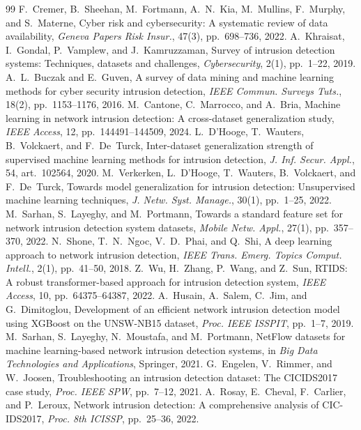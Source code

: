 \documentclass[11pt,a4paper]{article}
\begin{document}
\begin{thebibliography}{99}
 F.~Cremer, B.~Sheehan, M.~Fortmann, A.~N.~Kia, M.~Mullins, F.~Murphy, and S.~Materne, Cyber risk and cybersecurity: A systematic review of data availability, \emph{Geneva Papers Risk Insur.}, 47(3), pp.~698--736, 2022.
 A.~Khraisat, I.~Gondal, P.~Vamplew, and J.~Kamruzzaman, Survey of intrusion detection systems: Techniques, datasets and challenges, \emph{Cybersecurity}, 2(1), pp.~1--22, 2019.
 A.~L.~Buczak and E.~Guven, A survey of data mining and machine learning methods for cyber security intrusion detection, \emph{IEEE Commun. Surveys Tuts.}, 18(2), pp.~1153--1176, 2016.
 M.~Cantone, C.~Marrocco, and A.~Bria, Machine learning in network intrusion detection: A cross-dataset generalization study, \emph{IEEE Access}, 12, pp.~144491--144509, 2024.
 L.~D'Hooge, T.~Wauters, B.~Volckaert, and F.~De~Turck, Inter-dataset generalization strength of supervised machine learning methods for intrusion detection, \emph{J. Inf. Secur. Appl.}, 54, art.~102564, 2020.
 M.~Verkerken, L.~D'Hooge, T.~Wauters, B.~Volckaert, and F.~De~Turck, Towards model generalization for intrusion detection: Unsupervised machine learning techniques, \emph{J. Netw. Syst. Manage.}, 30(1), pp.~1--25, 2022.
 M.~Sarhan, S.~Layeghy, and M.~Portmann, Towards a standard feature set for network intrusion detection system datasets, \emph{Mobile Netw. Appl.}, 27(1), pp.~357--370, 2022.
 N.~Shone, T.~N.~Ngoc, V.~D.~Phai, and Q.~Shi, A deep learning approach to network intrusion detection, \emph{IEEE Trans. Emerg. Topics Comput. Intell.}, 2(1), pp.~41--50, 2018.
 Z.~Wu, H.~Zhang, P.~Wang, and Z.~Sun, RTIDS: A robust transformer-based approach for intrusion detection system, \emph{IEEE Access}, 10, pp.~64375--64387, 2022.
 A.~Husain, A.~Salem, C.~Jim, and G.~Dimitoglou, Development of an efficient network intrusion detection model using XGBoost on the UNSW-NB15 dataset, \emph{Proc. IEEE ISSPIT}, pp.~1--7, 2019.
 M.~Sarhan, S.~Layeghy, N.~Moustafa, and M.~Portmann, NetFlow datasets for machine learning-based network intrusion detection systems, in \emph{Big Data Technologies and Applications}, Springer, 2021.
 G.~Engelen, V.~Rimmer, and W.~Joosen, Troubleshooting an intrusion detection dataset: The CICIDS2017 case study, \emph{Proc. IEEE SPW}, pp.~7--12, 2021.
 A.~Rosay, E.~Cheval, F.~Carlier, and P.~Leroux, Network intrusion detection: A comprehensive analysis of CIC-IDS2017, \emph{Proc. 8th ICISSP}, pp.~25--36, 2022.

\end{thebibliography}
\end{document}
